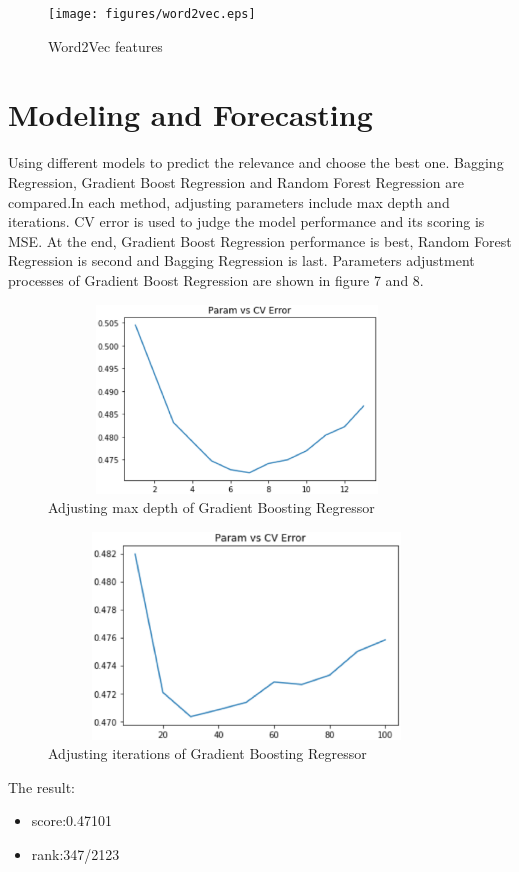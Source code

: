 \begin{figure}[htb]
	\centering
	\texttt{[image: figures/word2vec.eps]}
	\caption{Word2Vec features
	}\label{straddltimeScale}
\end{figure}

\section{Modeling and Forecasting} \label{sec-experiment}
\noindent Using different models to predict the relevance and choose the best one. Bagging Regression, Gradient Boost Regression and Random Forest Regression are compared.In each method, adjusting parameters include max depth and iterations. CV error is used to judge the model performance and its scoring is MSE. At the end,  Gradient Boost Regression performance is best, Random Forest Regression is second and Bagging Regression is last. Parameters adjustment processes of Gradient Boost Regression are shown in figure 7 and 8.  


\begin{figure}[htb]
	\centering
	\includegraphics[width=10cm, height=5cm]{figures/adjust3.eps}
	\caption{Adjusting max depth of Gradient Boosting Regressor
	}\label{straddltimeScale}
\end{figure}
\begin{figure}[htb]
	\centering
	\includegraphics[width=10.5cm, height=5.5cm]{figures/adjust2.eps}
	\caption{Adjusting iterations of Gradient Boosting Regressor
	}\label{straddltimeScale}
\end{figure}
\noindent The result:
	\begin{itemize}
	\item score:0.47101
	\smallskip
	\item rank:347/2123
\end{itemize}


